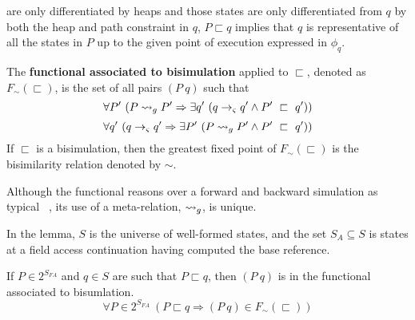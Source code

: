 are only differentiated by heaps and those states are only
differentiated from $q$ by both the heap and path constraint in $q$,
$P \sqsubset q$ implies that $q$ is representative of all the states
in $P$ up to the given point of execution expressed in $\phi_q$.
\begin{definition}
\label{bisimulation}
The \textbf{functional associated to bisimulation} applied to $\sqsubset$, denoted as $F_\sim(\sqsubset)$, is the set of all pairs
$(P\ q)$ such that
\begin{equation}
\label{eqn:BisimulationForwards}
\forall P^\prime\ ( P \leadsto_{g} P^\prime \Rightarrow \exists q^\prime\ ( q \rightarrow_{\varsigma} q^\prime \wedge P^\prime\ \sqsubset\ q^\prime))
\end{equation}
\begin{equation}
\label{eqn:BisimulationBackwards}
\forall q^\prime\ ( q \rightarrow_{\varsigma} q^\prime\Rightarrow \exists P^\prime\ ( P \leadsto_{g} P^\prime \wedge P^\prime\ \sqsubset\ q^\prime))
\end{equation}
If $\sqsubset$ is a bisimulation, then the greatest fixed point of $F_\sim(\sqsubset)$ is the bisimilarity relation denoted by $\sim$.
\end{definition}
Although the functional reasons over a forward and backward
simulation as typical~ \cite{Sangiorgi:2011}, its use of a meta-relation, $\leadsto_{g}$, is unique. 

In the lemma, $S$ is the universe of well-formed states, and the
set $S_A \subseteq S$ is states at a field access continuation having computed the base reference.
\begin{lemma}
If $P \in 2^{S_\mathit{FA}}$ and $q \in S$ are such that $P \sqsubset q$, then $(P\ q)$ is in the functional associated to bisumlation.
\label{lem:access}
$$
\forall P \in 2^{S_\mathit{FA}}\ (P \sqsubset q \Rightarrow (P\ q) \in F_\sim(\sqsubset))
$$
\end{lemma}

